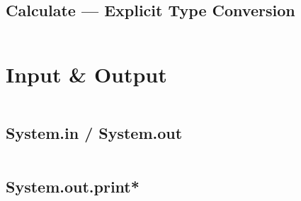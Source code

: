 \documentclass[
  11pt, %
  xcolor=dvipsnames
]{beamer}
\begin{document}
\subsection{Calculate --- Explicit Type Conversion}
\begin{frame}[fragile]

	\begin{columns}[c]
		\begin{column}{0.9\textwidth}


		\end{column}
	\end{columns}

\end{frame}


\section{Input \& Output}
\begin{frame}[fragile]

	\begin{columns}[c]
		\begin{column}{0.9\textwidth}


		\end{column}
	\end{columns}

\end{frame}

\subsection{System.in / System.out}
\begin{frame}[fragile]

	\begin{columns}[c]
		\begin{column}{0.9\textwidth}


		\end{column}
	\end{columns}

\end{frame}

\subsection{System.out.print*}
\begin{frame}[fragile]

	\begin{columns}[c]
		\begin{column}{0.9\textwidth}


		\end{column}
	\end{columns}

\end{frame}
\end{document}

